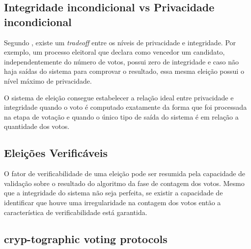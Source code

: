         \cite{coney2005PrivacyMeasurement}
    
    \subsection{Integridade incondicional vs Privacidade incondicional} 
        Segundo \cite{infoModelWote}, existe um \textit{tradeoff} entre os níveis de privacidade e integridade. Por exemplo, um processo eleitoral que declara como vencedor um candidato, independentemente do número de votos, possui zero de integridade e caso não haja saídas do sistema para comprovar o resultado, essa mesma eleição possui o nível máximo de privacidade.
        
        O sistema de eleição consegue estabelecer a relação ideal entre privacidade e integridade quando o voto é computado exatamente da forma que foi processada na etapa de votação e quando o único tipo de saída do sistema é em relação a quantidade dos votos.
        
    \subsection{Eleições Verificáveis} 
        O fator de verificabilidade de uma eleição pode ser resumida pela capacidade de validação sobre o resultado do algoritmo da fase de contagem dos votos. Mesmo que a integridade do sistema não seja perfeita, se existir a capacidade de identificar que houve uma irregularidade na contagem dos votos então a característica de verificabilidade está garantida.
        \cite{infoModelWote}
    
    \subsection{cryp-tographic voting protocols}
        \cite{adida2008helios}

